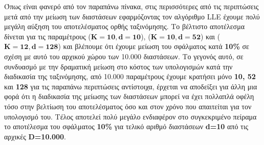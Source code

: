 \par
Όπως είναι φανερό από τον παραπάνω πίνακα, στις περισσότερες από τις περιπτώσεις μετά από την μείωση των διαστάσεων εφαρμόζοντας τον αλγόριθμο \textlatin{LLE} έχουμε πολύ μεγάλη αύξηση του αποτελέσματος ορθής ταξινόμησης. Το βέλτιστο αποτέλεσμα δίνεται για τις παραμέτρους ($\mathbf{K=10, d=10}$), ($\mathbf{K=10,d=52}$) και ($\mathbf{K=12,d=128}$) και βλέπουμε ότι έχουμε μείωση του σφάλματος κατά \textbf{10\%} σε σχέση με αυτό του αρχικού χώρου των 10.000 διαστάσεων. Το γεγονός αυτό, σε συνδυασμό με την δραματική μείωση στο κόστος των υπολογισμών κατά την διαδικασία της ταξινόμησης, από 10.000 παραμέτρους έχουμε κρατήσει μόνο \textbf{10, 52} και \textbf{128} για τις παραπάνω περιπτώσεις αντίστοιχα, έρχεται να αποδείξει για άλλη μια φορά ότι η διαδικασία της μείωσης των διαστάσεων μπορεί να έχει πολλαπλά οφέλη τόσο στην βελτίωση του αποτελέσματος όσο και στον χρόνο που απαιτείται για τον υπολογισμό του. Τέλος αποτελεί πολύ μεγάλο ενδιαφέρον στο συγκεκριμένο πείραμα το αποτέλεσμα του σφάλματος \textbf{10\%} για τελικό αριθμό διαστάσεων \textbf{\textlatin{d}=10} από τις αρχικές \textbf{\textlatin{D}=10.000}.